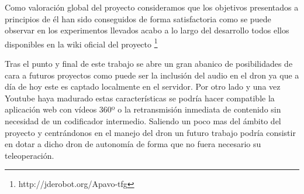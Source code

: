 \begin{enumerate}
    Como valoración global del proyecto consideramos que los objetivos presentados a principios de él han sido conseguidos de forma satisfactoria como se puede observar en los experimentos llevados acabo a lo largo del desarrollo todos ellos disponibles en la wiki oficial del proyecto \footnote{http://jderobot.org/Apavo-tfg}
    
    Tras el punto y final de este trabajo se abre un gran abanico de posibilidades de cara a futuros proyectos como puede ser la inclusión del audio en el dron ya que a día de hoy este es captado localmente en el servidor.
    Por otro lado y una vez Youtube haya madurado estas características se podría hacer compatible la aplicación web con vídeos 360º o la retransmisión inmediata de contenido sin necesidad de un codificador intermedio.
    Saliendo un poco mas del ámbito del proyecto y centrándonos en el manejo del dron un futuro trabajo podría consistir en dotar a dicho dron de autonomía de forma que no fuera necesario su teleoperación.
\end{enumerate}